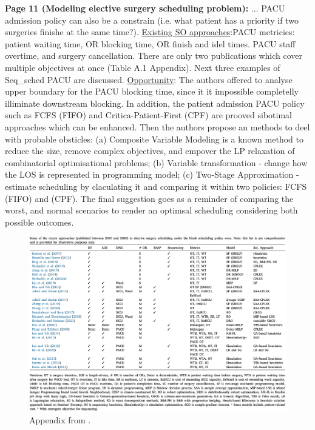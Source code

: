     \textbf{Page 11 (Modeling elective surgery scheduling problem):}
    ... PACU admission policy can also be a constrain (i.e. what patient has a priority if two surgeries finishe at the same time?). \underline{Existing SO approaches}:PACU metricies: patient waiting time, OR blocking time, OR finish and idel times. PACU staff overtime, and surgery cancellation. There are only two publications which cover multiple objectives at once (Table A.1 Appendix). Next three examples of Seq\_sched PACU are discussed. \underline{Opportunity}: The authors offered to analyse upper boundary for the PACU blocking time, since it it impossible completelly illiminate downstream blocking. In addition, the patient admission PACU policy such as FCFS (FIFO) and Critica-Patient-First (CPF) are prooved sibotimal approaches which can be enhanced. Then the authors propose an methods to deel with probable obsticles: (a) Composite Variable Modeling is a known method to reduce the size, remove complex objectives, and empover the LP relaxation of combinatorial optimisational problems; (b) Variable transformation - change how the LOS is represented in programming model; (c) Two-Stage Approximation - estimate scheduling by claculating it and comparing it within two policies: FCFS (FIFO) and (CPF). The final suggestion goes as a reminder of comparing the worst, and normal scenarios to render an optimsal scheduling considering both possible outcomes.
    \begin{figure}[H]
        \centering
        \includegraphics[width=1\textwidth]{figures/SR0015US22/fig9.png}
        \caption{Appendix from \cite{x335}.}
        \label{fig9:SR0015US22}
    \end{figure}

